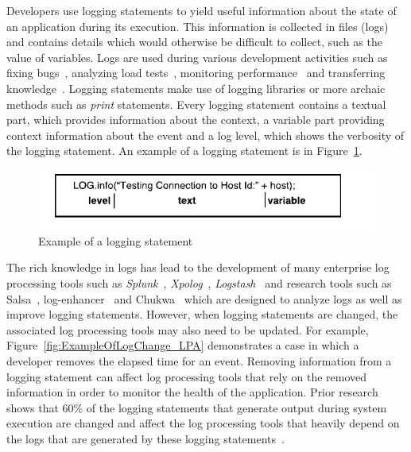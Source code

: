 

Developers use logging statements to yield useful information about the state of an application during its execution. This information is collected in files (logs) and contains details  which would otherwise be difficult to collect, such as the value of variables. Logs are used during various development activities such as fixing bugs~\cite{ConsoleLogs,JGLouMining,QFuanomaly}, analyzing load tests~\cite{Automatic}, monitoring performance~\cite{Yuan} and transferring knowledge~\cite{IanWCRE}.
Logging statements make use of logging libraries or more archaic methods such as \textsl{print} statements. Every logging statement contains a textual part, which provides information about the context, a variable part providing context information about the event and a log level, which shows the verbosity of the logging statement. An example of a logging statement is in Figure~\ref{fig:logexample}.

\begin{figure}[thb]
	\centering
	\includegraphics[width=1\columnwidth]{logexample}
	\caption{Example of a logging statement}
	\label{fig:logexample}
\end{figure}




The rich knowledge in logs has lead to the development of many enterprise log processing tools such as \textsl{Splunk}~\cite{carasso2012exploring}, \textsl{Xpolog}~\cite{xpolog}, \textsl{Logstash}~\cite{xu2013detecting} and research tools such as Salsa~\cite{TanSalsa}, log-enhancer~\cite{Yuan} and Chukwa~\cite{chukwa} which are designed to analyze logs as well as improve logging statements. However, when logging statements are changed, the associated log processing tools may also need to be updated. For example, Figure~\ref{fig:ExampleOfLogChange_LPA} demonstrates a case in which a developer removes the elapsed time for an event. Removing information from a logging statement can affect log processing tools that rely on the removed information in order to monitor the health of the application. Prior research shows that 60\% of the logging statements that generate output during system execution are changed and affect the log processing tools that heavily depend on the logs that are generated by these logging statements~\cite{IanWCRE}.

